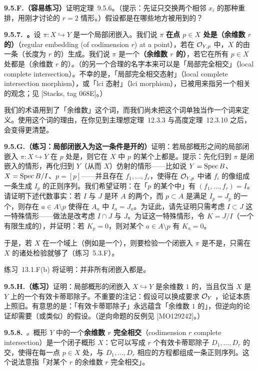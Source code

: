 \textbf{9.5.F.（容易练习）}\quad 证明定理~9.5.6。（提示：先证只交换两个相邻 $x_i$ 的那种重排，用刚才讨论的 $r=2$ 情形。）\trNoetherian{}假设都是在哪些地方被用到的？

\textbf{9.5.7.\ \trRegularEmbedding{}。}\quad 设 $\pi\colon X\hookrightarrow Y$ 是一个局部闭嵌入。我们说 $\pi$ \textbf{在点 $p\in X$ 处是（余维数 $r$ 的）\trRegularEmbedding{}}（regular embedding (of codimension $r$) at a point），若在\trLocalRing{} $\mathcal{O}_{Y,p}$ 中，$X$ 的\trIdeal{}由一条（长度为 $r$ 的）\trRegularSequence{}生成。我们说 $\pi$ 是一个\textbf{（余维数 $r$ 的）\trRegularEmbedding{}}，若它在所有 $p\in X$ 处都是（余维数 $r$ 的）\trRegularEmbedding{}。（\trRegularEmbedding{}的另一个合理的名字本来可以是「局部完全相交」（local complete intersection）。不幸的是，「局部完全相交态射」（local complete intersection morphism），或「lci 态射」（lci morphism），已被用来指另一个相关的观念；见 [Stacks, tag 068E]。）

我们的术语用到了「余维数」这个词，而我们尚未把这个词单独当作一个词来定义。使用这个词的理由，在你见到\trKrull{}主理想定理~12.3.3 与\trKrull{}高度定理~12.3.10 之后，会变得更清楚。

\textbf{9.5.G.（练习：局部闭嵌入为\trRegularEmbedding{}这一条件是开的）}\quad 证明：若局部\trNoetherian{}概形之间的局部闭嵌入 $\pi\colon X\hookrightarrow Y$ 在 $p$ 处是\trRegularEmbedding{}，则它在 $X$ 中 $p$ 的某个\trOpen\trNeighborhood{}上都是\trRegularEmbedding{}。提示：先化归到 $\pi$ 是闭嵌入的情形，再化归到 $Y$（从而 $X$）仿射的情形——比如说 $Y=\operatorname{Spec} B$、$X=\operatorname{Spec} B/I$、$p=[p]$——并且存在 $f_1,\dots,f_r$，使得在 $\mathcal{O}_{Y,p}$ 中诸 $f_i$ 的像组成一条生成 $I_p$ 的正则序列。我们希望证明：在「$p$ 的某个\trOpen\trNeighborhood{}中」有 $(f_1,\dots,f_r)=I$。请证明下述代数事实：若 $I$ 与 $J$ 是\trNoetherian{}环 $A$ 的两个\trIdeal，而 $p\subset A$ 是满足 $I_p=J_p$ 的一个\trPrimeIdeal，则存在 $a\in A\setminus p$ 使得在 $A_a$ 中 $I_a=J_a$。为证此，请先证明只需考虑 $I\subset J$ 这一特殊情形——做法是改考虑 $I\cap J$ 与 $J$。为证这一特殊情形，令 $K=J/I$（一个有限生成的\trModule），并证明：若 $K_p=0$，则对某个 $a\in A\setminus p$ 有 $K_a=0$。

于是，若 $X$ 在一个域上\trLocally\trFiniteType（例如是一个\trVariety），则要检验一个闭嵌入 $\pi$ 是不是\trRegularEmbedding{}，只需在 $X$ 的诸\trClosedPoint{}处检验就够了（\mbox{练习~5.3.F}）。

\mbox{练习~13.1.F}(b) 将证明：并非所有闭嵌入都是\trRegularEmbedding{}。

\textbf{9.5.H.（练习）}\quad 证明：局部\trNoetherian{}概形的闭嵌入 $X\hookrightarrow Y$ 是余维数 $1$ 的\trRegularEmbedding{}，当且仅当 $X$ 是 $Y$ 上的一个有效卡蒂耶除子。不重要的注记：\trNoetherian{}假设可以换成要求 $\mathcal{O}_Y$ \trCoh，论证本质上照旧。有意思的是：「有效卡蒂耶除子」永远蕴含「余维数 $1$ 的\trRegularEmbedding{}」，但逆向的论证却需要\trNoetherian（或类似）的假设。（逆向命题的反例见 [MO129242]。）

\textbf{9.5.8.}\ \emph{\trhDefinition{}。}\quad 概形 $Y$ 中的一个\textbf{余维数 $r$ 完全相交}（codimension $r$ complete intersection）是一个闭子概形 $X$：它可以写成 $r$ 个有效卡蒂耶除子 $D_1,\dots,D_r$ 的\trSchemeTheoretic{}交，使得在每一点 $p\in X$ 处，与 $D_1,\dots,D_r$ 相应的方程都组成一条正则序列。\textbf{\trCompleteIntersection{}}这个说法意指「对某个 $r$ 的余维数 $r$ 完全相交」。
